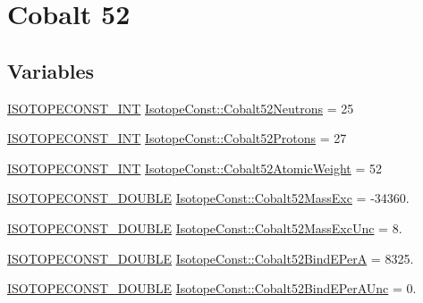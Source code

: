 \hypertarget{group___isotope_const-_cobalt-_co52}{}\section{Cobalt 52}
\label{group___isotope_const-_cobalt-_co52}
\subsection*{Variables}
\begin{DoxyCompactItemize}
\item 
\mbox{\hyperlink{group___isotope_const-_macros_ga5f18360b3e99483a35c32d789e62621c}{I\+S\+O\+T\+O\+P\+E\+C\+O\+N\+S\+T\+\_\+\+I\+NT}} \mbox{\hyperlink{group___isotope_const-_cobalt-_co52_ga8285a937a1e390729bb57fb4feffc442}{Isotope\+Const\+::\+Cobalt52\+Neutrons}} = 25
\item 
\mbox{\hyperlink{group___isotope_const-_macros_ga5f18360b3e99483a35c32d789e62621c}{I\+S\+O\+T\+O\+P\+E\+C\+O\+N\+S\+T\+\_\+\+I\+NT}} \mbox{\hyperlink{group___isotope_const-_cobalt-_co52_gaf061704eab22b7b291a86b9cf0094f90}{Isotope\+Const\+::\+Cobalt52\+Protons}} = 27
\item 
\mbox{\hyperlink{group___isotope_const-_macros_ga5f18360b3e99483a35c32d789e62621c}{I\+S\+O\+T\+O\+P\+E\+C\+O\+N\+S\+T\+\_\+\+I\+NT}} \mbox{\hyperlink{group___isotope_const-_cobalt-_co52_ga899610b95c3026bd2833acf730c4349d}{Isotope\+Const\+::\+Cobalt52\+Atomic\+Weight}} = 52
\item 
\mbox{\hyperlink{group___isotope_const-_macros_ga8f45a7272ce02c0b4c65c44636ed719a}{I\+S\+O\+T\+O\+P\+E\+C\+O\+N\+S\+T\+\_\+\+D\+O\+U\+B\+LE}} \mbox{\hyperlink{group___isotope_const-_cobalt-_co52_gac9021cbf03ac514787eb0f5370099e41}{Isotope\+Const\+::\+Cobalt52\+Mass\+Exc}} = -\/34360.
\item 
\mbox{\hyperlink{group___isotope_const-_macros_ga8f45a7272ce02c0b4c65c44636ed719a}{I\+S\+O\+T\+O\+P\+E\+C\+O\+N\+S\+T\+\_\+\+D\+O\+U\+B\+LE}} \mbox{\hyperlink{group___isotope_const-_cobalt-_co52_gac3fccd2df3cebfabe1620b24121df30e}{Isotope\+Const\+::\+Cobalt52\+Mass\+Exc\+Unc}} = 8.
\item 
\mbox{\hyperlink{group___isotope_const-_macros_ga8f45a7272ce02c0b4c65c44636ed719a}{I\+S\+O\+T\+O\+P\+E\+C\+O\+N\+S\+T\+\_\+\+D\+O\+U\+B\+LE}} \mbox{\hyperlink{group___isotope_const-_cobalt-_co52_ga8c8353af4114ddcedf39d05a27a2fcf2}{Isotope\+Const\+::\+Cobalt52\+Bind\+E\+PerA}} = 8325.
\item 
\mbox{\hyperlink{group___isotope_const-_macros_ga8f45a7272ce02c0b4c65c44636ed719a}{I\+S\+O\+T\+O\+P\+E\+C\+O\+N\+S\+T\+\_\+\+D\+O\+U\+B\+LE}} \mbox{\hyperlink{group___isotope_const-_cobalt-_co52_gaf20f975139ed474c3971814992c43cea}{Isotope\+Const\+::\+Cobalt52\+Bind\+E\+Per\+A\+Unc}} = 0.

\end{DoxyCompactItemize}
